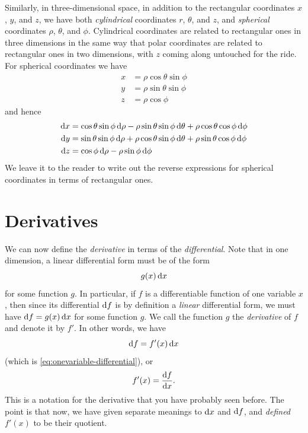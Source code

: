 \documentclass[12pt]{amsart}
\begin{document}
Similarly, in three-dimensional space, in addition to the rectangular coordinates $x$, $y$, and $z$, we have both \emph{cylindrical} coordinates $r$, $\theta$, and $z$, and \emph{spherical} coordinates $\rho$, $\theta$, and $\phi$.
Cylindrical coordinates are related to rectangular ones in three dimensions in the same way that polar coordinates are related to rectangular ones in two dimensions, with $z$ coming along untouched for the ride.
For spherical coordinates we have
\begin{align*}
  x &= \rho \cos\theta \sin\phi\\
  y &= \rho \sin\theta \sin\phi\\
  z &= \rho\cos\phi
\end{align*}
and hence
\begin{align*}
  {\ensuremath{\mathrm{d} x}} &= \cos\theta \sin\phi \,{\mathrm{d} \rho} - \rho\sin\theta\sin\phi \,{\mathrm{d} \theta} + \rho\cos\theta\cos\phi \,{\mathrm{d} \phi}\\
  {\mathrm{d} y} &= \sin\theta \sin\phi\,{\mathrm{d} \rho} + \rho\cos\theta\sin\phi \,{\mathrm{d} \theta} + \rho\sin\theta\cos\phi \,{\mathrm{d} \phi}\\
  {\mathrm{d} z} &= \cos\phi\,{\mathrm{d} \rho} - \rho\sin\phi\,{\mathrm{d} \phi}
\end{align*}
We leave it to the reader to write out the reverse expressions for spherical coordinates in terms of rectangular ones.


\section{Derivatives}
\label{sec:derivatives}

We can now define the \emph{derivative} in terms of the \emph{differential}.
Note that in one dimension, a linear differential form must be of the form
\[ g(x) \,{\mathrm{d} x} \]
for some function $g$.
In particular, if $f$ is a differentiable function of one variable $x$, then since its differential ${\mathrm{d} f}$ is by definition a \emph{linear} differential form, we must have ${\mathrm{d} f} = g(x) \, {\mathrm{d} x}$ for some function $g$.
We call the function $g$ the \emph{derivative} of $f$ and denote it by $f'$.
In other words, we have
\[{\mathrm{d} f} = f'(x)\,{\mathrm{d} x}\]
(which is \cref{eq:onevariable-differential}), or
\[ f'(x) = \frac{{\mathrm{d} f}}{{\mathrm{d} x}}. \]
This is a notation for the derivative that you have probably seen before.
The point is that now, we have given separate meanings to ${\mathrm{d} x}$ and ${\mathrm{d} f}$, and \emph{defined} $f'(x)$ to be their quotient.
\end{document}
